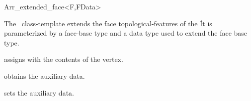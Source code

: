 
\ccRefPageBegin

\begin{ccRefClass}{Arr_extended_face<F,FData>}

\ccDefinition
  The \ccRefName\ class-template extends the face topological-features of the
  \dcel\. It is parameterized by a face-base type  and a data type
   used to extend the face base type.


\ccIsModel

\ccInheritsFrom

\ccCreation
  {assigns \ccVar{} with the contents of the  vertex.}

\ccAccessFunctions
  {obtains the auxiliary data.}

\ccModifiers
  {sets the auxiliary data.}

\ccSeeAlso

\end{ccRefClass}

\ccRefPageEnd
